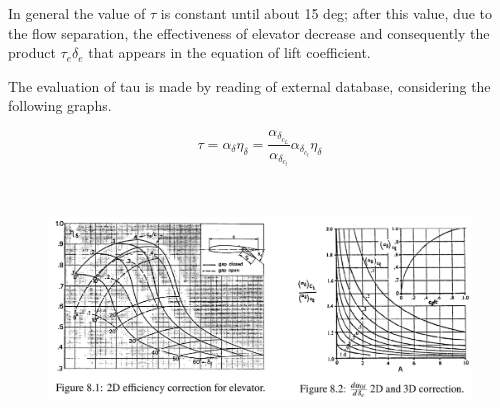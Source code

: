  In general the value of $\tau$ is constant until about 15 deg; after this value, due to the flow separation, the effectiveness of elevator decrease and consequently the product $ \tau_e \delta_e$ that appears in the equation of lift coefficient.
		
		
The evaluation of tau is made by reading of external database, considering the following graphs.
	
\begin{equation}
\tau = \alpha_{\delta} \eta_{\delta} = \frac{\alpha_{{\delta}_{c_L}}}{\alpha_{{\delta}_{c_l}}}\alpha_{{\delta}_{c_l}} \eta_{\delta}
\end{equation}



%
%

\begin{figure}[H]
\centering
{\includegraphics[height=6.79cm]{Immagini/alfadeltanew.png}} 
\label{efficiency}
\end{figure} 		


		



